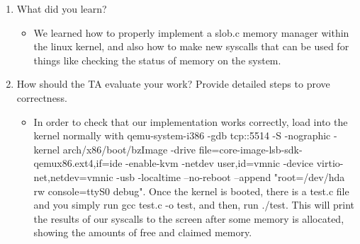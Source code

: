 \documentclass[journal,10pt,onecolumn,compsoc]{IEEEtran} \usepackage[margin=1.0in]{geometry} \usepackage{pdfpages}
\begin{document}
\begin {enumerate}
\begin{itemize}
    \end{itemize}
\item What did you learn? 
	\begin{itemize}
    	\item We learned how to properly implement a slob.c memory manager within the linux kernel, and also how to make new syscalls that can be used for things like checking the status of memory on the system.
        
    \end{itemize}
\item How should the TA evaluate your work? Provide detailed steps to prove correctness.
	\begin{itemize}
    	\item In order to check that our implementation works correctly, load into the kernel normally with qemu-system-i386 -gdb tcp::5514 -S -nographic -kernel arch/x86/boot/bzImage -drive file=core-image-lsb-sdk-qemux86.ext4,if=ide -enable-kvm -netdev user,id=vmnic -device virtio-net,netdev=vmnic -usb -localtime --no-reboot --append "root=/dev/hda rw console=ttyS0 debug". Once the kernel is booted, there is a test.c file and you simply run gcc test.c -o test, and then, run ./test. This will print the results of our syscalls to the screen after some memory is allocated, showing the amounts of free and claimed memory.

    \end{itemize}

\end{enumerate}

\pagebreak
\end{document}
